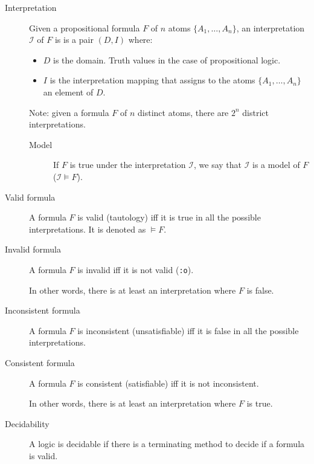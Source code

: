 \begin{description}
    \item[Interpretation] 
        Given a propositional formula $F$ of $n$ atoms $ \{ A_1, \dots, A_n \}$,
        an interpretation $\mathcal{I}$ of $F$ is is a pair $(D, I)$ where:
        \begin{itemize}
            \item $D$ is the domain. Truth values in the case of propositional logic.
            \item $I$ is the interpretation mapping that assigns
                to the atoms $\{ A_1, \dots, A_n \}$ an element of $D$.
        \end{itemize}

        Note: given a formula $F$ of $n$ distinct atoms, there are $2^n$ district interpretations.

        \begin{description}
            \item[Model] 
                If $F$ is true under the interpretation $\mathcal{I}$, 
                we say that $\mathcal{I}$ is a model of $F$ ($\mathcal{I} \models F$).
        \end{description}

    \item[Valid formula] 
        A formula $F$ is valid (tautology) iff it is true in all the possible interpretations.
        It is denoted as $\models F$.

    \item[Invalid formula] 
        A formula $F$ is invalid iff it is not valid {\tiny(\texttt{:o})}.
        
        In other words, there is at least an interpretation where $F$ is false.

    \item[Inconsistent formula] 
        A formula $F$ is inconsistent (unsatisfiable) iff it is false in all the possible interpretations.
    
    \item[Consistent formula] 
        A formula $F$ is consistent (satisfiable) iff it is not inconsistent.

        In other words, there is at least an interpretation where $F$ is true.

    \item[Decidability] 
        A logic is decidable if there is a terminating method to decide if a formula is valid.


\end{description}
